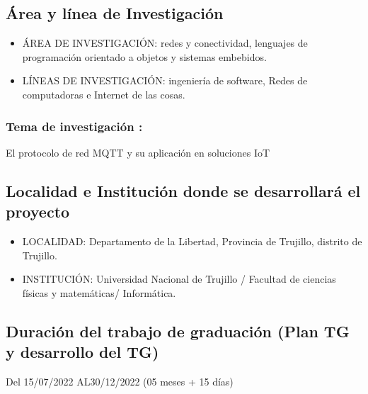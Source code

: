 \documentclass[a4paper, 12pt]{article}
\begin{document}
\subsection{Área y línea de Investigación}
\begin{itemize}
\item ÁREA DE INVESTIGACIÓN: redes y conectividad, lenguajes de programación orientado a objetos y sistemas embebidos.
\item LÍNEAS DE INVESTIGACIÓN: ingeniería de software, Redes de computadoras e Internet de las cosas.

\end{itemize}

               
\subsubsection{Tema de investigación :} 

El protocolo de red MQTT y su aplicación en soluciones IoT

\subsection{Localidad e Institución donde se desarrollará el proyecto }

\begin{itemize}

\item LOCALIDAD: 
Departamento de la Libertad, Provincia de Trujillo, distrito de Trujillo.

\item INSTITUCIÓN: 
Universidad Nacional de Trujillo / Facultad de ciencias físicas y matemáticas/ Informática.

\end{itemize}




  
\subsection{Duración del trabajo de graduación (Plan TG y desarrollo del TG)}
\hspace*{0.7cm}Del \hspace*{0.2cm}15/07/2022 \hspace*{0.3cm} AL\hspace*{0.2cm}30/12/2022  \hspace*{0.2cm}(05 meses +  15 días)
  
\end{document}
